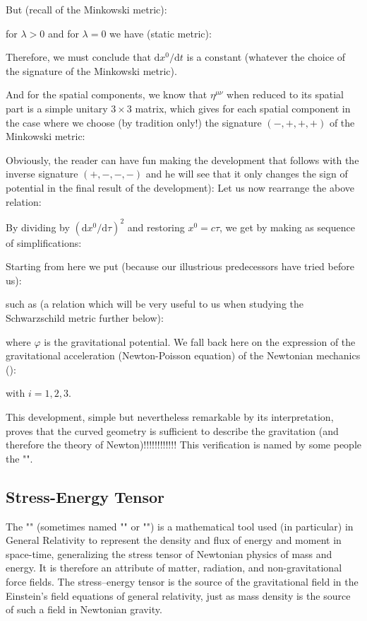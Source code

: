	But (recall of the Minkowski metric):
	
	for $\lambda>0$ and for $\lambda=0$ we have (static metric):
	
	Therefore, we must conclude that $\mathrm{d}x^0/\mathrm{d}t$ is a constant (whatever the choice of the signature of the Minkowski metric).

	And for the spatial components, we know that $\eta^{\mu\nu}$ when reduced to its spatial part is a simple unitary $3\times 3$ matrix, which gives for each spatial component in the case where we choose (by tradition only!) the signature $(-, +, +, +)$ of the Minkowski metric:
	
	Obviously, the reader can have fun making the development that follows with the inverse signature $(+, -, -, -)$ and he will see that it only changes the sign of potential in the final result of the development):
	Let us now rearrange the above relation:
	
	By dividing by $(\mathrm{d}x^0/\mathrm{d}\tau)^2$ and restoring $x^0=c\tau$, we get by making as sequence of simplifications:
	
	Starting from here we put (because our illustrious predecessors have tried before us):
	
	such as (a relation which will be very useful to us when studying the Schwarzschild metric further below):
	
	where $\varphi$ is the gravitational potential. We fall back here on the expression of the gravitational acceleration (Newton-Poisson equation) of the Newtonian mechanics ():
	
	with $i=1,2,3$.

	This development, simple but nevertheless remarkable by its interpretation, proves that the curved geometry is sufficient to describe the gravitation (and therefore the theory of Newton)!!!!!!!!!!!! This verification is named by some people the "".
	
	\subsection{Stress-Energy Tensor}
	The "" (sometimes named "" or "\label{energy momentum tensor}") is a mathematical tool used (in particular) in General Relativity to represent the density and flux of energy and moment in space-time, generalizing the stress tensor of Newtonian physics of mass and energy. It is therefore an attribute of matter, radiation, and non-gravitational force fields. The stress–energy tensor is the source of the gravitational field in the Einstein's field equations of general relativity, just as mass density is the source of such a field in Newtonian gravity.
	
